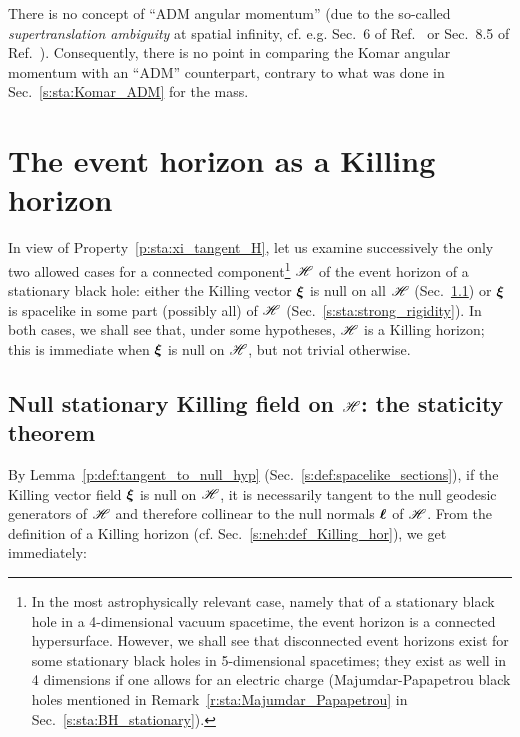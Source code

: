 \begin{remark}
There is no concept of ``ADM angular momentum'' (due to the so-called
\emph{supertranslation ambiguity} at spatial infinity, cf. e.g. Sec.~6 of Ref.~\cite{York79}
or Sec.~8.5 of Ref.~\cite{Gourg12}). Consequently, there is no point in comparing the Komar angular momentum
with an ``ADM'' counterpart, contrary to what was done in Sec.~\ref{s:sta:Komar_ADM} for the mass.
\end{remark}



\section{The event horizon as a Killing horizon} \label{s:sta:EH_KH}

In view of Property~\ref{p:sta:xi_tangent_H}, let us
examine successively the only two allowed cases for a
connected component\footnote{In the most astrophysically relevant case, namely
that of a stationary black hole in a 4-dimensional vacuum spacetime, the event horizon
is a connected hypersurface.
However, we shall see that disconnected event horizons exist for some stationary
black holes in 5-dimensional spacetimes; they exist as well in 4 dimensions if one allows
for an electric charge
(Majumdar-Papapetrou black holes mentioned in
Remark~\ref{r:sta:Majumdar_Papapetrou} in Sec.~\ref{s:sta:BH_stationary}).}
$\mathscr{H}$ of the event horizon of a stationary black hole:
either the Killing vector $\bm{\xi}$ is null on all $\mathscr{H}$
(Sec.~\ref{s:sta:staticity_thm}) or $\bm{\xi}$ is spacelike in some part
(possibly all) of $\mathscr{H}$ (Sec.~\ref{s:sta:strong_rigidity}).
In both cases, we shall see
that, under some hypotheses, $\mathscr{H}$ is a Killing horizon; this is immediate when
$\bm{\xi}$ is null on $\mathscr{H}$, but not trivial otherwise.

\subsection{Null stationary Killing field on $\mathscr{H}$: the staticity theorem}\label{s:sta:staticity_thm}

By Lemma~\ref{p:def:tangent_to_null_hyp} (Sec.~\ref{s:def:spacelike_sections}),
if the Killing vector
field $\bm{\xi}$ is null on $\mathscr{H}$, it is necessarily tangent to the null geodesic generators
of $\mathscr{H}$ and therefore collinear to the null normals $\bm{\ell}$ of $\mathscr{H}$. From the definition
of a Killing horizon (cf. Sec.~\ref{s:neh:def_Killing_hor}), we get immediately:

